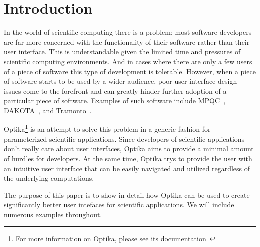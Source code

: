 \section{Introduction}
In the world of scientific computing there is a problem: most software 
developers are far more concerned with the functionality of their software 
rather than their user interface. This is understandable given
the limited time and pressures of scientific computing environments. And in 
cases where there are only a few users of a piece of software this type of 
development is tolerable. However, when a piece of software starts to be used 
by a wider audience, poor user interface design issues come to the forefront 
and can greatly hinder further adoption of a particular piece of software. 
Examples of such software include MPQC~\cite{mpqc}, DAKOTA~\cite{dakota}, and 
Tramonto~\cite{tramonto}.

Optika\footnote{For more information on Optika, please see
its documentation~\cite{OptikaPackage}} is an attempt to solve this
problem in a generic fashion for parameterized scientific applications.
Since developers of scientific applications don't really care about user 
interfaces, Optika aims to provide a minimal amount of hurdles for developers. 
At the same time, Optika trys to provide the user with an intuitive user
interface that can be easily navigated and utilized regardless of the 
underlying computations.

The purpose of this paper is to show in detail how Optika can be used to create
significantly better user intefaces for scientific applications. We will include
numerous examples throughout.
